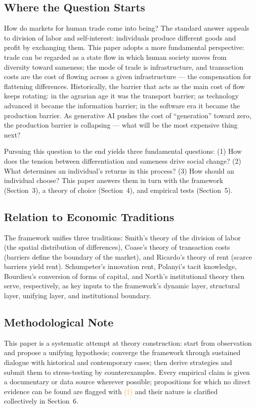 \documentclass[11pt]{article}
\newcommand{\infmark}{\textcolor{orange}{(\(\dagger\))}}
\begin{document}
\subsection{Where the Question Starts}
How do markets for human trade come into being? The standard answer appeals to division of labor and self-interest: individuals produce different goods and profit by exchanging them. This paper adopts a more fundamental perspective: trade can be regarded as a state flow in which human society moves from diversity toward sameness; the mode of trade is infrastructure, and transaction costs are the cost of flowing across a given infrastructure --- the compensation for flattening differences. Historically, the barrier that acts as the main cost of flow keeps rotating: in the agrarian age it was the transport barrier; as technology advanced it became the information barrier; in the software era it became the production barrier. As generative AI pushes the cost of ``generation'' toward zero, the production barrier is collapsing --- what will be the most expensive thing next?

Pursuing this question to the end yields three fundamental questions: (1) How does the tension between differentiation and sameness drive social change? (2) What determines an individual's returns in this process? (3) How should an individual choose? This paper answers them in turn with the framework (Section~3), a theory of choice (Section~4), and empirical tests (Section~5).

\subsection{Relation to Economic Traditions}
The framework unifies three traditions: Smith's theory of the division of labor (the spatial distribution of differences), Coase's theory of transaction costs (barriers define the boundary of the market), and Ricardo's theory of rent (scarce barriers yield rent). Schumpeter's innovation rent, Polanyi's tacit knowledge, Bourdieu's conversion of forms of capital, and North's institutional theory then serve, respectively, as key inputs to the framework's dynamic layer, structural layer, unifying layer, and institutional boundary.

\subsection{Methodological Note}
This paper is a systematic attempt at theory construction: start from observation and propose a unifying hypothesis; converge the framework through sustained dialogue with historical and contemporary cases; then derive strategies and submit them to stress-testing by counterexamples. Every empirical claim is given a documentary or data source wherever possible; propositions for which no direct evidence can be found are flagged with \infmark{} and their nature is clarified collectively in Section~6.
\end{document}
